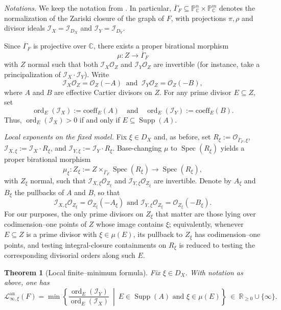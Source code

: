 \documentclass[12pt]{amsart}
\newcommand{\RR}{\mathbb{R}}
\newcommand{\CC}{\mathbb{C}}
\newcommand{\PP}{\mathbb{P}}
\newcommand{\Supp}{\operatorname{\mathrm{Supp}}}
\newcommand{\ord}{\operatorname{\mathrm{ord}}}
\newcommand{\cI}{\mathcal{I}}
\newcommand{\cO}{\mathcal{O}}
\newcommand{\Loj}{\mathcal{L}} %
\DeclareMathOperator{\Spec}{Spec}
\theoremstyle{plain}
\newtheorem{theorem}{Theorem}[section]
\theoremstyle{definition}
\numberwithin{equation}{section}
\begin{document}
\smallskip
\noindent\textit{Notations.} We keep the notation from .
In particular, $\overline{\Gamma}_F\subseteq \PP^n_\CC\times \PP^m_\CC$ denotes the normalization of the
Zariski closure of the graph of $F$, with projections $\pi,\rho$ and divisor ideals
$\mathscr I_X=\cI_{D_X}$ and $\mathscr I_Y=\cI_{D_Y}$.

Since $\overline{\Gamma}_F$ is projective over $\CC$, there exists a proper birational morphism
\begin{equation}\label{eq:13.7-fixed-model}
	\mu:Z \longrightarrow \overline{\Gamma}_F
\end{equation}
with $Z$ normal such that both $\mathscr I_X\cO_Z$ and $\mathscr I_Y\cO_Z$ are invertible
(for instance, take a principalization of $\mathscr I_X\cdot \mathscr I_Y$).
Write
\begin{equation}\label{eq:13.8-divisors}
	\mathscr I_X\cO_Z=\cO_Z(-A) \ \text{ and }\ \mathscr I_Y\cO_Z=\cO_Z(-B),
\end{equation}
where $A$ and $B$ are effective Cartier divisors on $Z$.
For any prime divisor $E\subseteq Z$, set
\[
\ord_E(\mathscr I_X):=\text{coeff}_E(A) \quad\text{and}\quad \ord_E(\mathscr I_Y):=\text{coeff}_E(B).
\]
Thus, $\ord_E(\mathscr I_X)>0$ if and only if $E\subseteq \Supp(A)$.

\medskip
\noindent\textit{Local exponents on the fixed model.}
Fix $\xi\in D_X$ and, as before, set $R_\xi:=\cO_{\overline{\Gamma}_F,\xi}$,
$\mathscr I_{X,\xi}:=\mathscr I_X\cdot R_\xi$, and $\mathscr I_{Y,\xi}:=\mathscr I_Y\cdot R_\xi$.
Base-changing $\mu$ to $\Spec(R_\xi)$ yields a proper birational morphism
\[
\mu_\xi:Z_\xi:= Z \times_{\overline{\Gamma}_F}\Spec(R_\xi)\longrightarrow \Spec(R_\xi),
\]
with $Z_\xi$ normal, such that $\mathscr I_{X,\xi}\cO_{Z_\xi}$ and $\mathscr I_{Y,\xi}\cO_{Z_\xi}$
are invertible. Denote by $A_\xi$ and $B_\xi$ the pullbacks of $A$ and $B$, so that
\[
\mathscr I_{X,\xi}\cO_{Z_\xi}=\cO_{Z_\xi}(-A_\xi) \text{ and }
\mathscr I_{Y,\xi}\cO_{Z_\xi}=\cO_{Z_\xi}(-B_\xi).
\]
For our purposes, the only prime divisors on $Z_\xi$ that matter are those lying over codimension--one
points of $Z$ whose image contains $\xi$; equivalently, whenever $E\subseteq Z$ is a prime divisor with
$\xi\in\mu(E)$, its pullback to $Z_\xi$ has codimension--one points, and testing integral-closure
containments on $R_\xi$ is reduced to testing the corresponding divisorial orders along such $E$.

\begin{theorem}[Local finite--minimum formula]\label{thm:13.3-local-min}
	Fix $\xi\in D_X$. With notation as above, one has
	\begin{equation}\label{eq:13.9-local-min}
		\Loj^{\text{an}}_{\infty,\xi}(F)
		=
		\min\left\{
		\frac{\ord_E(\mathscr I_Y)}{\ord_E(\mathscr I_X)}
		\ \middle|\
		E\in \Supp(A)\text{ and }\xi\in \mu(E)
		\right\}
		\ \in\ \RR_{\ge 0}\cup\{\infty\}.
	\end{equation}
\end{theorem}
\end{document}
